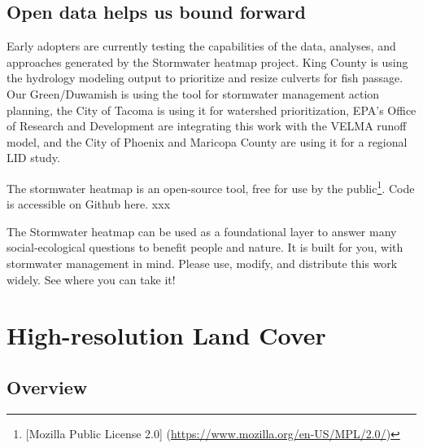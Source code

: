 \documentclass[
]{report}
\begin{document}
\hypertarget{open-data-helps-us-bound-forward}{%
\section{Open data helps us bound forward}\label{open-data-helps-us-bound-forward}}

Early adopters are currently testing the capabilities of the data, analyses, and approaches generated by the Stormwater heatmap project. King County is using the hydrology modeling output to prioritize and resize culverts for fish passage. Our Green/Duwamish is using the tool for stormwater management action planning, the City of Tacoma is using it for watershed prioritization, EPA's Office of Research and Development are integrating this work with the VELMA runoff model, and the City of Phoenix and Maricopa County are using it for a regional LID study.

The stormwater heatmap is an open-source tool, free for use by the public\footnote{{[}Mozilla Public License 2.0{]} (\url{https://www.mozilla.org/en-US/MPL/2.0/})}. Code is accessible on Github here. xxx

The Stormwater heatmap can be used as a foundational layer to answer many social-ecological questions to benefit people and nature. It is built for you, with stormwater management in mind. Please use, modify, and distribute this work widely. See where you can take it!

\hypertarget{high-resolution-land-cover}{%
\chapter{High-resolution Land Cover}\label{high-resolution-land-cover}}

\hypertarget{overview}{%
\section{Overview}\label{overview}}
\end{document}

